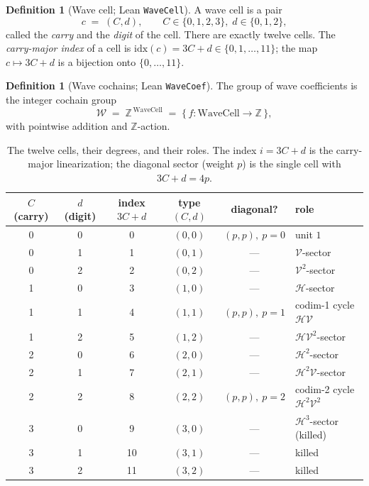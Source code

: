 \documentclass[11pt,a4paper]{article}
\theoremstyle{plain}
\theoremstyle{definition}
\newtheorem{definition}[theorem]{Definition}
\newcommand{\Z}{\mathbb{Z}}
\newcommand{\HC}{\mathcal{H}}
\newcommand{\VV}{\mathcal{V}}
\begin{document}
\begin{definition}[Wave cell; Lean \texttt{WaveCell}]\label{def:wavecell}
A wave cell is a pair
\[
  c \;=\; (C,d), \qquad C \in \{0,1,2,3\},\; d \in \{0,1,2\},
\]
called the \emph{carry} and the \emph{digit} of the cell. There are exactly
twelve cells. The \emph{carry-major index} of a cell is
$\mathrm{idx}(c) = 3C + d \in \{0,1,\dots,11\}$; the map
$c \mapsto 3C+d$ is a bijection onto $\{0,\dots,11\}$.
\end{definition}

\begin{definition}[Wave cochains; Lean \texttt{WaveCoef}]\label{def:wavecoef}
The group of wave coefficients is the integer cochain group
\[
  \mathcal{W} \;=\; \Z^{\,\mathrm{WaveCell}} \;=\; \{\, f : \mathrm{WaveCell}
  \to \Z \,\},
\]
with pointwise addition and $\Z$-action.
\end{definition}

\begin{table}[t]
\centering
\caption{The twelve cells, their degrees, and their roles. The index
$i = 3C + d$ is the carry-major linearization; the diagonal sector
(weight $p$) is the single cell with $3C+d = 4p$.}
\label{tab:cells}
\small
\begin{tabular}{cccccl}
\toprule
$C$ (carry) & $d$ (digit) & index $3C+d$ & type $(C,d)$ & diagonal? & role \\
\midrule
0 & 0 & 0  & $(0,0)$ & $(p,p),\ p=0$ & unit $1$ \\
0 & 1 & 1  & $(0,1)$ & --- & $\VV$-sector \\
0 & 2 & 2  & $(0,2)$ & --- & $\VV^{2}$-sector \\
1 & 0 & 3  & $(1,0)$ & --- & $\HC$-sector \\
1 & 1 & 4  & $(1,1)$ & $(p,p),\ p=1$ & codim-1 cycle $\HC\VV$ \\
1 & 2 & 5  & $(1,2)$ & --- & $\HC\VV^{2}$-sector \\
2 & 0 & 6  & $(2,0)$ & --- & $\HC^{2}$-sector \\
2 & 1 & 7  & $(2,1)$ & --- & $\HC^{2}\VV$-sector \\
2 & 2 & 8  & $(2,2)$ & $(p,p),\ p=2$ & codim-2 cycle $\HC^{2}\VV^{2}$ \\
3 & 0 & 9  & $(3,0)$ & --- & $\HC^{3}$-sector (killed) \\
3 & 1 & 10 & $(3,1)$ & --- & killed \\
3 & 2 & 11 & $(3,2)$ & --- & killed \\
\bottomrule
\end{tabular}
\end{table}
\end{document}
